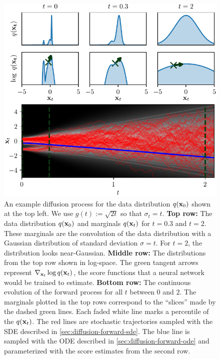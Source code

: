 \begin{figure}
    \centering
    \includegraphics[scale=1]{figs/thesis/diffusion_process.pdf}
    \caption{An example diffusion process for the data distribution $q({\mathbf{x}}_0)$ shown at the top left. We use $g(t) := \sqrt{2t}$ so that $\sigma_t = t$. \textbf{Top row:} The data distribution $q({\mathbf{x}}_0)$ and marginals $q({\mathbf{x}}_t)$ for $t=0.3$ and $t=2$. These marginals are the convolution of the data distribution with a Gaussian distribution of standard deviation $\sigma = t$. For $t=2$, the distribution looks near-Gaussian. \textbf{Middle row:} The distributions from the top row shown in log-space. The green tangent arrows represent $\nabla_{{\mathbf{x}}_t} \log q({\mathbf{x}}_t)$, the score functions that a neural network would be trained to estimate. \textbf{Bottom row:} The continuous evolution of the forward process for all $t$ between $0$ and $2$. The marginals plotted in the top rows correspond to the ``slices'' made by the dashed green lines. Each faded white line marks a percentile of the $q({\mathbf{x}}_t)$. The red lines are stochastic trajectories sampled with the SDE described in \cref{sec:diffusion-forward-sde}. The blue line is sampled with the ODE described in \cref{sec:diffusion-forward-ode} and parameterized with the score estimates from the second row.}
    \label{fig:diffusion-overview}
\end{figure}


